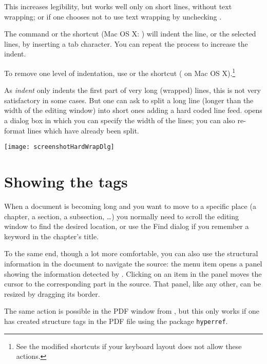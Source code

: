 This increases legibility, but works well only on short lines, without text wrapping; or if one chooses not to use text wrapping by unchecking \submenu{}.

The command \submenu{} or the shortcut \keysequence{Ctrl+]} (Mac OS X: \keysequence{Cmd+]}) will indent the line, or the selected lines, by inserting a tab character. You can repeat the process to increase the indent. 

To remove one level of indentation, use \submenu{} or the shortcut \keysequence{Ctrl+[} (\keysequence{Cmd+[} on Mac OS X).\footnote{See the modified shortcuts if your keyboard layout does not allow these actions.}

As \textsl{indent} only indents the first part of very long (wrapped) lines, this is not very satisfactory in some cases. But one can ask {\Tw} to split a long line (longer than the width of the editing window) into short ones adding a hard coded line feed. \submenu{} opens a dialog box in which you can specify the width of the lines; you can also re-format lines which have already been split.

\begin{center}
\texttt{[image: screenshotHardWrapDlg]}
\end{center}

\section{Showing the tags}

When a document is becoming long and you want to move to a specific place (a chapter, a section, a subsection, \dots) you normally need to scroll the editing window to find the desired location, or use the Find dialog if you remember a keyword in the chapter's title.

To the same end, though a lot more comfortable, you can also use the structural information in the document to navigate the source: the menu item \submenu{}\submenu{} opens a panel showing the information detected by {\Tw}. Clicking on an item in the panel moves the cursor to the corresponding part in the source. That panel, like any other, can be resized by dragging its border.

The same action is possible in the PDF window from \submenu{}\submenu{}, but this only works if one has created structure tags in the PDF file using the package \verb|hyperref|.

